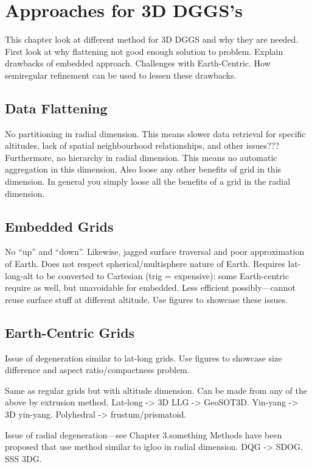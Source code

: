 \chapter{Approaches for 3D DGGS's} \label{chap:3ddggs}
This chapter look at different method for 3D DGGS and why they are needed.
First look at why flattening not good enough solution to problem.
Explain drawbacks of embedded approach.
Challenges with Earth-Centric.
How semiregular refinement can be used to lessen these drawbacks.


\section{Data Flattening}
No partitioning in radial dimension.
This means slower data retrieval for specific altitudes, lack of spatial neighbourhood relationships, and other issues???
Furthermore, no hierarchy in radial dimension.
This means no automatic aggregation in this dimension.
Also loose any other benefits of grid in this dimension.
In general you simply loose all the benefits of a grid in the radial dimension.


\section{Embedded Grids}
No ``up'' and ``down''.
Likewise, jagged surface traversal and poor approximation of Earth.
Does not respect spherical/multisphere nature of Earth.
Requires lat-long-alt to be converted to Cartesian (trig = expensive): some Earth-centric require as well, but unavoidable for embedded.
Less efficient possibly---cannot reuse surface stuff at different altitude.
Use figures to showcase these issues.


\section{Earth-Centric Grids}
Issue of degeneration similar to lat-long grids.
Use figures to showcase size difference and aspect ratio/compactness problem.



Same as regular grids but with altitude dimension.
Can be made from any of the above by extrusion method.
Lat-long -> 3D LLG -> GeoSOT3D.
Yin-yang -> 3D yin-yang.
Polyhedral -> frustum/prismatoid.
\cite{yoo2019concept}
\cite{sun20153d}
\cite{yoshida2004application}
\cite{kageyama2005geodynamo}
\cite{tackley2008modelling}


Issue of radial degeneration---see Chapter 3.something
Methods have been proposed that use method similar to igloo in radial dimension.
DQG -> SDOG.
SSS 3DG.
\cite{yu2009sdog}
\cite{yu2012large-scale}
\cite{yu2012lithosphere}
\cite{gang2013sphere} 
\cite{wang2013global}




